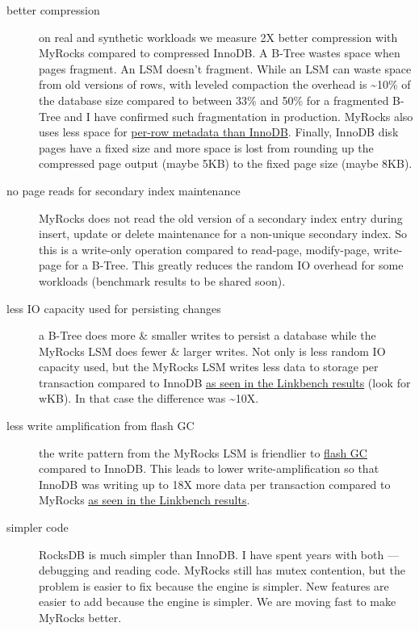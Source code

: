 \documentclass[a4paper,12pt,notitlepage,twoside,openright]{article}
\begin{document}
\begin{description}
\item
  [better compression] on real and synthetic workloads we measure 2X
  better compression with MyRocks compared to compressed InnoDB. A
  B-Tree wastes space when pages fragment. An LSM doesn't fragment.
  While an LSM can waste space from old versions of rows, with leveled
  compaction the overhead is \textasciitilde10\% of the database size
  compared to between 33\% and 50\% for a fragmented B-Tree and I have
  confirmed such fragmentation in production. MyRocks also uses less
  space for
  \href{http://dev.mysql.com/doc/refman/5.7/en/innodb-multi-versioning.html}{per-row
  metadata than InnoDB}. Finally, InnoDB disk pages have a fixed size
  and more space is lost from rounding up the compressed page output
  (maybe 5KB) to the fixed page size (maybe 8KB).
\item
  [no page reads for secondary index maintenance] MyRocks does not read
  the old version of a secondary index entry during insert, update or
  delete maintenance for a non-unique secondary index. So this is a
  write-only operation compared to read-page, modify-page, write-page
  for a B-Tree. This greatly reduces the random IO overhead for some
  workloads (benchmark results to be shared soon).
\item
  [less IO capacity used for persisting changes] a B-Tree does more \&
  smaller writes to persist a database while the MyRocks LSM does fewer
  \& larger writes. Not only is less random IO capacity used, but the
  MyRocks LSM writes less data to storage per transaction compared to
  InnoDB
  \href{http://smalldatum.blogspot.com/2016/01/rocksdb-vs-innodb-via-linkbench.html}{as
  seen in the Linkbench results} (look for wKB). In that case the
  difference was \textasciitilde10X.
\item
  [less write amplification from flash GC] the write pattern from the
  MyRocks LSM is friendlier to
  \href{https://en.wikipedia.org/wiki/Write_amplification\#BG-GC}{flash
  GC} compared to InnoDB. This leads to lower write-amplification so
  that InnoDB was writing up to 18X more data per transaction compared
  to MyRocks
  \href{http://smalldatum.blogspot.com/2016/01/even-more-write-amplification-when.html}{as
  seen in the Linkbench results}.
\item
  [simpler code] RocksDB is much simpler than InnoDB. I have spent years
  with both --- debugging and reading code. MyRocks still has mutex
  contention, but the problem is easier to fix because the engine is
  simpler. New features are easier to add because the engine is simpler.
  We are moving fast to make MyRocks better.
\end{description}
\end{document}
